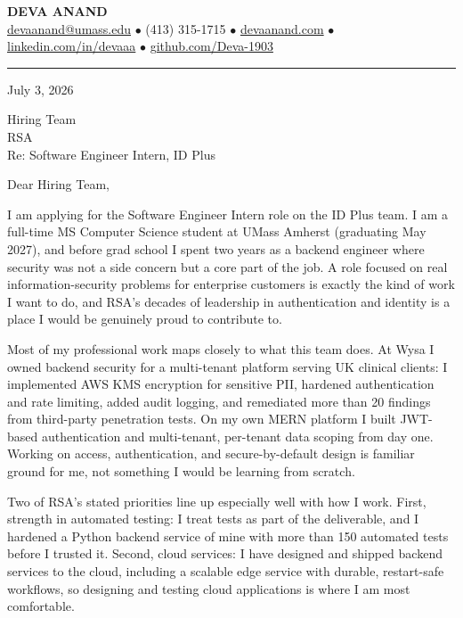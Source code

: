 \documentclass[letterpaper,11pt]{article}
\begin{document}
\begin{center}
    {\fontsize{18}{20}\selectfont\bfseries DEVA ANAND}\\ \vspace{3pt}
    {\small
    \href{mailto:devaanand@umass.edu}{devaanand@umass.edu}
    \enspace$\bullet$\enspace
    (413) 315-1715
    \enspace$\bullet$\enspace
    \href{https://devaanand.com}{devaanand.com}
    \enspace$\bullet$\enspace
    \href{https://linkedin.com/in/devaaa/}{linkedin.com/in/devaaa}
    \enspace$\bullet$\enspace
    \href{https://github.com/Deva-1903}{github.com/Deva-1903}}
\end{center}
\vspace{6pt}
\hrule
\vspace{10pt}

\noindent July 3, 2026

\vspace{4pt}

\noindent Hiring Team\\
RSA\\
Re: Software Engineer Intern, ID Plus

\vspace{6pt}

\noindent Dear Hiring Team,

I am applying for the Software Engineer Intern role on the ID Plus team. I am a full-time MS Computer Science student at UMass Amherst (graduating May 2027), and before grad school I spent two years as a backend engineer where security was not a side concern but a core part of the job. A role focused on real information-security problems for enterprise customers is exactly the kind of work I want to do, and RSA's decades of leadership in authentication and identity is a place I would be genuinely proud to contribute to.

Most of my professional work maps closely to what this team does. At Wysa I owned backend security for a multi-tenant platform serving UK clinical clients: I implemented AWS KMS encryption for sensitive PII, hardened authentication and rate limiting, added audit logging, and remediated more than 20 findings from third-party penetration tests. On my own MERN platform I built JWT-based authentication and multi-tenant, per-tenant data scoping from day one. Working on access, authentication, and secure-by-default design is familiar ground for me, not something I would be learning from scratch.

Two of RSA's stated priorities line up especially well with how I work. First, strength in automated testing: I treat tests as part of the deliverable, and I hardened a Python backend service of mine with more than 150 automated tests before I trusted it. Second, cloud services: I have designed and shipped backend services to the cloud, including a scalable edge service with durable, restart-safe workflows, so designing and testing cloud applications is where I am most comfortable.
\end{document}
